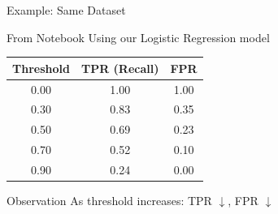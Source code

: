 \documentclass{beamer}
\begin{document}
\begin{frame}{Example: Same Dataset}
\begin{examplebox}{From Notebook}
\small
Using our Logistic Regression model
\end{examplebox}

\vspace{0.15cm}

\begin{center}
\small
\begin{tabular}{|c|c|c|}
\hline
\textbf{Threshold} & \textbf{TPR (Recall)} & \textbf{FPR} \\
\hline
0.00 & 1.00 & 1.00 \\
\hline
0.30 & 0.83 & 0.35 \\
\hline
0.50 & 0.69 & 0.23 \\
\hline
0.70 & 0.52 & 0.10 \\
\hline
0.90 & 0.24 & 0.00 \\
\hline
\end{tabular}
\end{center}

\vspace{0.15cm}

\begin{keypointsbox}{Observation}
\small
As threshold increases: TPR $\downarrow$, FPR $\downarrow$
\end{keypointsbox}
\end{frame}
\end{document}
